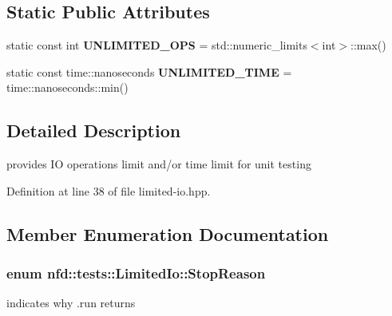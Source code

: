 \subsection*{Static Public Attributes}
\begin{DoxyCompactItemize}
\item 
static const int {\bfseries U\+N\+L\+I\+M\+I\+T\+E\+D\+\_\+\+O\+PS} = std\+::numeric\+\_\+limits$<$int$>$\+::max()\hypertarget{classnfd_1_1tests_1_1LimitedIo_a7860e2c6f71684afecffbd5f19ccaed3}{}\label{classnfd_1_1tests_1_1LimitedIo_a7860e2c6f71684afecffbd5f19ccaed3}

\item 
static const time\+::nanoseconds {\bfseries U\+N\+L\+I\+M\+I\+T\+E\+D\+\_\+\+T\+I\+ME} = time\+::nanoseconds\+::min()\hypertarget{classnfd_1_1tests_1_1LimitedIo_a61351a86c02f38bb5ca0fb094f6cf607}{}\label{classnfd_1_1tests_1_1LimitedIo_a61351a86c02f38bb5ca0fb094f6cf607}

\end{DoxyCompactItemize}


\subsection{Detailed Description}
provides IO operations limit and/or time limit for unit testing 

Definition at line 38 of file limited-\/io.\+hpp.



\subsection{Member Enumeration Documentation}
\subsubsection[{\texorpdfstring{Stop\+Reason}{StopReason}}]{\setlength{\rightskip}{0pt plus 5cm}enum {\bf nfd\+::tests\+::\+Limited\+Io\+::\+Stop\+Reason}}\hypertarget{classnfd_1_1tests_1_1LimitedIo_adbe63f8389fb55a9267d5291c48319c3}{}\label{classnfd_1_1tests_1_1LimitedIo_adbe63f8389fb55a9267d5291c48319c3}


indicates why .run returns 


